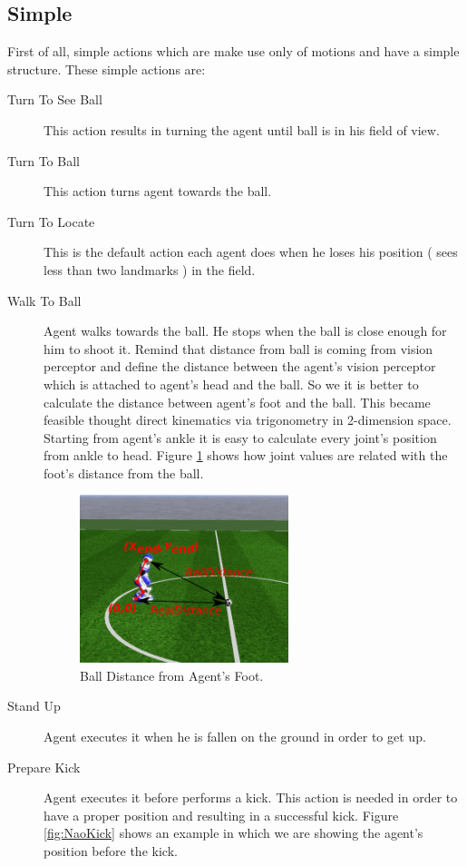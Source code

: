 \subsection{Simple}
First of all, simple actions which are make use only of motions and have a simple structure. These simple actions are:
\begin{description}
 \item[Turn To See Ball] This action results in turning the agent until ball is in his field of view.
 \item[Turn To Ball] This action turns agent towards the ball.
 \item[Turn To Locate] This is the default action each agent does when he loses his position ( sees less than two landmarks ) in the field.
 \item[Walk To Ball] Agent walks towards the ball. He stops when the ball is close enough for him to shoot it. Remind that distance from ball is coming from vision perceptor and define the distance between the agent's vision perceptor which is attached to agent's head and the ball. So we it is better to calculate the distance between agent's foot and the ball. This became feasible thought direct kinematics via trigonometry in 2-dimension space. Starting from agent's ankle it is easy to calculate every joint's position from ankle to head. Figure \ref{fig:2dkinematics} shows how joint values are related with the foot's distance from the ball.
 \begin{figure}[!h]
\centering
  \includegraphics[width=0.6\textwidth]{Chapter3/figures/2dkinematics.pdf}
  \caption{Ball Distance from Agent's Foot.}
  \label{fig:2dkinematics}
\end{figure}
 \item[Stand Up] Agent executes it when he is fallen on the ground in order to get up.
 \item[Prepare Kick] Agent executes it before performs a kick. This action is needed in order to have a proper position and resulting in a successful kick. Figure \ref{fig:NaoKick} shows an example in which we are showing the agent's position before the kick.

\end{description}
